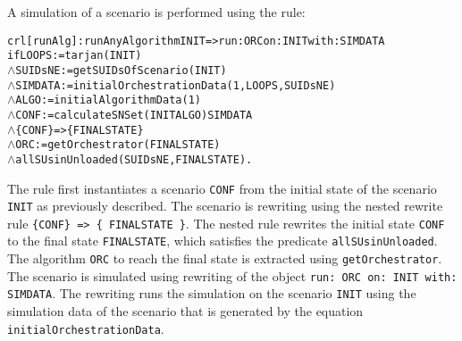 A simulation of a scenario is performed using the rule:
\small
\begin{alltt}
crl [runAlg] : runAnyAlgorithm INIT => run: ORC on: INIT with: SIMDATA
  if LOOPS := tarjan(INIT)
  \(\land\) SUIDsNE := getSUIDsOfScenario(INIT)
  \(\land\) SIMDATA := initialOrchestrationData(1,LOOPS,SUIDsNE)
  \(\land\) ALGO := initialAlgorithmData(1)
  \(\land\) CONF := calculateSNSet(INIT ALGO) SIMDATA 
  \(\land\) \{CONF\} => \{ FINALSTATE \} 
  \(\land\) ORC := getOrchestrator(FINALSTATE)
  \(\land\) allSUsinUnloaded(SUIDsNE, FINALSTATE) .
\end{alltt}
\normalsize
The rule first instantiates a scenario \texttt{CONF} from the initial state of the scenario \texttt{INIT} as previously described.
The scenario is rewriting using the nested rewrite rule \texttt{\{CONF\} => \{ FINALSTATE \}}. 
The nested rule rewrites the initial state \texttt{CONF} to the final state \texttt{FINALSTATE}, which satisfies the predicate \texttt{allSUsinUnloaded}.
The algorithm \texttt{ORC} to reach the final state is extracted using \texttt{getOrchestrator}.
The scenario is simulated using rewriting of the object \texttt{run: ORC on: INIT with: SIMDATA}.
The rewriting runs the simulation on the scenario \texttt{INIT} using the simulation data of the scenario that is generated by the equation \texttt{initialOrchestrationData}.

